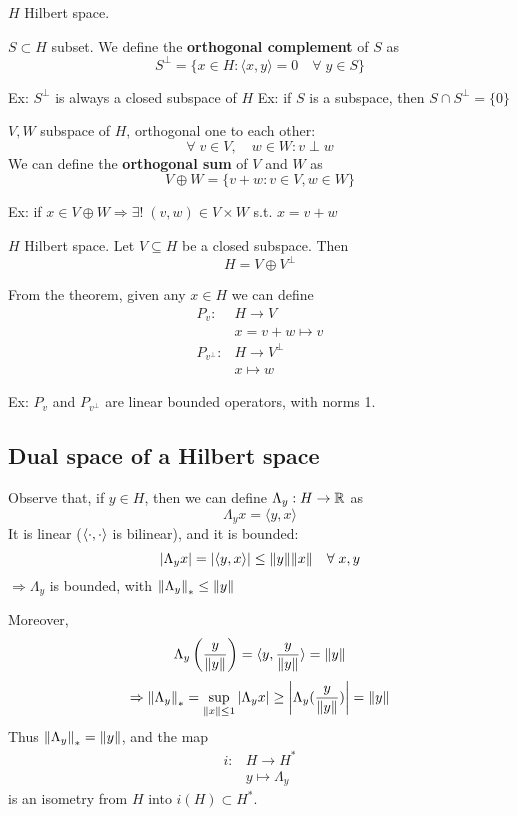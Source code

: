 \(H\) Hilbert space. 
\begin{definition}
    \(S \subset H\) subset. We define the \textbf{orthogonal complement} of \(S\) as 
    \[
        S^\perp = \{ x \in H:  \langle x, y\rangle = 0 \quad \forall\; y \in S\}
    \]
\end{definition}
Ex: \(S^\perp \) is always a closed subspace of \(H\)
Ex: if \(S\) is a subspace, then \(S \cap S^\perp = \{0\}\)

\begin{definition}
    \(V, W\) subspace of \(H\), orthogonal one to each other:
    \[
        \forall \; v \in V, \quad w \in W: v \perp w
    \]
    We can define the \textbf{orthogonal sum} of \(V\) and \(W\) as 
    \[
        V \oplus W = \{ v+w : v \in V, w \in W \}
    \]
\end{definition}
Ex: if \(x \in V \oplus W \Rightarrow \exists! \; (v, w) \in V \times W\) s.t. \(x=v+w\)

\begin{theorem}
    \(H\) Hilbert space. Let \(V \subseteq H\) be a closed subspace. Then 
    \[
        H = V \oplus V^\perp
    \]
\end{theorem}

\begin{definition}
    From the theorem, given any \(x \in H\) we can define
    \[
        \begin{array}{rl}
            P_v: & H \to V \\
            & x = v + w \mapsto v \\ \tag*{orthogonal projections}
            P_{v^\perp} : & H \to V^\perp \\
            & x \mapsto w
        \end{array}
    \]
\end{definition}
Ex: \(P_v \) and \(P_{v^\perp}\) are linear bounded operators, with norms 1.
\subsection*{Dual space of a Hilbert space}
Observe that, if \(y \in H\), then we can define \(\Lambda_y : H \to \mathbb{R}\) as
\[
    \Lambda_y x = \langle y, x\rangle  
\]
It is linear (\(\langle \cdot,\cdot \rangle   \) is bilinear), and it is bounded: 
\[
    \abs{\Lambda_y x}= \abs{\langle y, x\rangle  } \leq \norm{y} \norm{x} \quad \forall\; x, y
\]
\(\Rightarrow \Lambda_y\) is bounded, with \(\norm{\Lambda_y}_* \leq \norm{y}\)

Moreover, 
\[
    \Lambda_y \left(\frac{y}{\norm{y}}\right) = \langle y, \frac{y}{\norm{y}}\rangle   = \norm{y}
\]
\[
    \Rightarrow \norm{\Lambda_y}_* = \sup_{\norm{x} \leq 1} \abs{\Lambda_y x} \geq \abs{\Lambda_y (\frac{y}{\norm{y}})} = \norm{y}
\]
Thus \( \norm{\Lambda_y}_* = \norm{y}\), and the map 
\[
    \begin{array}{rl}
        i: & H \to H^* \\
        & y \mapsto \Lambda_y    
    \end{array}
\]
is an isometry from \(H\) into \(i(H) \subset {H^*}\).

